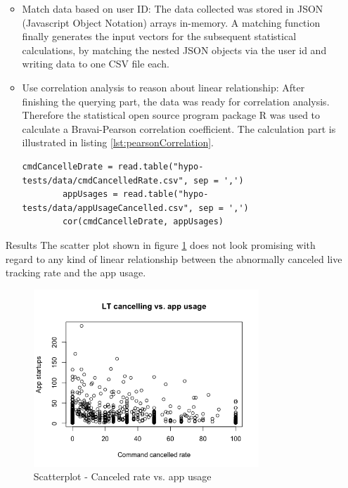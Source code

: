 \begin{enumerate}
\begin{itemize}
		\item Match data based on user ID: The data collected was stored in JSON (Javascript Object Notation) arrays in-memory. A matching function finally generates the input vectors for the subsequent statistical calculations, by matching the nested JSON objects via the user id and writing data to one CSV file each. 
		\item Use correlation analysis to reason about linear relationship: After finishing the querying part, the data was ready for correlation analysis. Therefore the statistical open source program package R was used to calculate a Bravai-Pearson correlation coefficient. The calculation part is illustrated in listing \ref{lst:pearsonCorrelation}. 
		
		\begin{lstlisting}[caption={Calculation of pearson correlation and statistical test in R}, label={lst:pearsonCorrelation}]
		cmdCancelleDrate = read.table("hypo-tests/data/cmdCancelledRate.csv", sep = ',')
		appUsages = read.table("hypo-tests/data/appUsageCancelled.csv", sep = ',')
		cor(cmdCancelleDrate, appUsages)
		\end{lstlisting}
	\end{itemize}
	\item [Results] 
	The scatter plot shown in figure \ref{fig:canceledvsAppUsage} does not look promising with regard to any kind of linear relationship between the abnormally canceled live tracking rate and the app usage. 
	
	\begin{figure}
		\centering
		\includegraphics[width=0.8\textwidth]{img/LT_cancelled_rate_vs_app_usage.png}
		\caption{Scatterplot - Canceled rate vs. app usage}
		\label{fig:canceledvsAppUsage}
	\end{figure} 
	

\end{enumerate}
